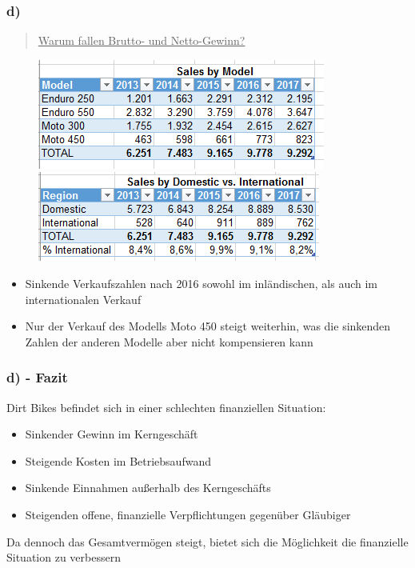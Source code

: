 \documentclass{beamer}
\begin{document}
\begin{frame}
\frametitle{d)}

\begin{quote}
\underline{Warum fallen Brutto- und Netto-Gewinn?}
\end{quote}

\begin{figure}
\includegraphics[scale=0.46]{financials3.PNG}
\includegraphics[scale=0.5]{financials4.PNG}
\end{figure}

\begin{itemize}
\item Sinkende Verkaufszahlen nach 2016 sowohl im inl\"andischen, als auch im internationalen Verkauf
\item Nur der Verkauf des Modells Moto 450 steigt weiterhin, was die sinkenden Zahlen der anderen Modelle aber nicht kompensieren kann
\end{itemize}

\end{frame}

\begin{frame}
\frametitle{d) - Fazit}

Dirt Bikes befindet sich in einer schlechten finanziellen Situation:
\begin{itemize}
\item Sinkender Gewinn im Kerngeschäft
\item Steigende Kosten im Betriebsaufwand
\item Sinkende Einnahmen außerhalb des Kerngesch\"afts
\item Steigenden offene, finanzielle Verpflichtungen gegenüber Gl\"aubiger
\end{itemize}

Da dennoch das Gesamtverm\"ogen steigt, bietet sich die M\"oglichkeit die finanzielle Situation zu verbessern

\end{frame}
\end{document}
